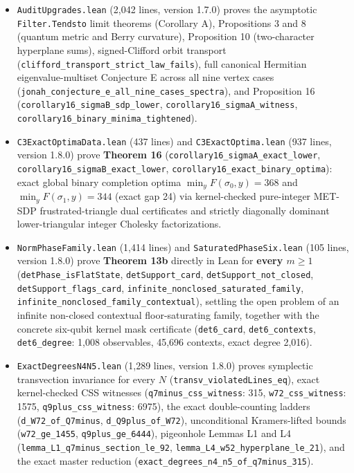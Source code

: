 \documentclass[11pt,a4paper]{article}
\begin{document}
\begin{itemize}
  \nolinkurl{corollary16_binary_minima_differ}).
\item
  \nolinkurl{AuditUpgrades.lean} (2,042 lines, version 1.7.0) proves the asymptotic \texttt{Filter.Tendsto} limit theorems
  (Corollary A), Propositions 3 and 8 (quantum metric and Berry curvature), Proposition 10 (two-character
  hyperplane sums), signed-Clifford orbit transport (\nolinkurl{clifford_transport_strict_law_fails}), full
  canonical Hermitian eigenvalue-multiset Conjecture E across all nine vertex cases
  (\nolinkurl{jonah_conjecture_e_all_nine_cases_spectra}), and Proposition 16\textquotesingle{} (\nolinkurl{corollary16_sigmaB_sdp_lower},
  \nolinkurl{corollary16_sigmaA_witness}, \nolinkurl{corollary16_binary_minima_tightened}).
\item
  \nolinkurl{C3ExactOptimaData.lean} (437 lines) and \nolinkurl{C3ExactOptima.lean} (937 lines, version 1.8.0) prove
  \textbf{Theorem 16\textquotesingle\textquotesingle{}} (\nolinkurl{corollary16_sigmaA_exact_lower}, \nolinkurl{corollary16_sigmaB_exact_lower},
  \nolinkurl{corollary16_exact_binary_optima}): exact global binary completion optima \(\min_y F(\sigma_0,y) = 368\)
  and \(\min_y F(\sigma_1,y) = 344\) (exact gap 24) via kernel-checked pure-integer MET-SDP frustrated-triangle
  dual certificates and strictly diagonally dominant lower-triangular integer Cholesky factorizations.
\item
  \nolinkurl{NormPhaseFamily.lean} (1,414 lines) and \nolinkurl{SaturatedPhaseSix.lean} (105 lines, version 1.8.0) prove
  \textbf{Theorem 13b} directly in Lean for \textbf{every \(m \ge 1\)} (\nolinkurl{detPhase_isFlatState}, \texttt{detSupport\_card},
  \nolinkurl{detSupport_not_closed}, \nolinkurl{detSupport_flags_card}, \nolinkurl{infinite_nonclosed_saturated_family},
  \nolinkurl{infinite_nonclosed_family_contextual}), settling the open problem of an infinite non-closed contextual
  floor-saturating family, together with the concrete six-qubit kernel mask certificate (\texttt{det6\_card},
  \texttt{det6\_contexts}, \texttt{det6\_degree}: 1,008 observables, 45,696 contexts, exact degree 2,016).
\item
  \nolinkurl{ExactDegreesN4N5.lean} (1,289 lines, version 1.8.0) proves symplectic transvection invariance for every
  \(N\) (\nolinkurl{transv_violatedLines_eq}), exact kernel-checked CSS witnesses (\nolinkurl{q7minus_css_witness}: 315,
  \texttt{w72\_css\_witness}: 1575, \nolinkurl{q9plus_css_witness}: 6975), the exact double-counting ladders
  (\texttt{d\_W72\_of\_Q7minus}, \texttt{d\_Q9plus\_of\_W72}), unconditional Kramers-lifted bounds (\texttt{w72\_ge\_1455},
  \texttt{q9plus\_ge\_6444}), pigeonhole Lemmas L1 and L4 (\nolinkurl{lemma_L1_q7minus_section_le_92},
  \nolinkurl{lemma_L4_w52_hyperplane_le_21}), and the exact master reduction (\nolinkurl{exact_degrees_n4_n5_of_q7minus_315}).
\end{itemize}
\end{document}
